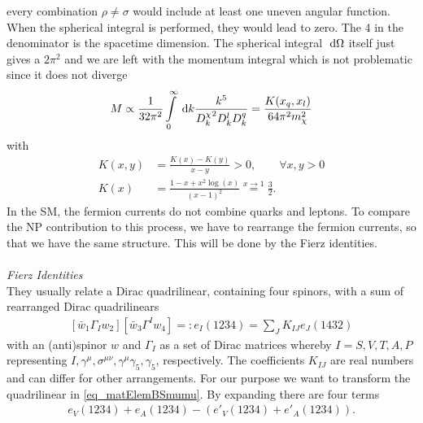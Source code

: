 every combination $\rho\neq\sigma$ would include at least one uneven angular function. When the spherical integral is performed, they would lead to zero. The 
4 in the denominator is the spacetime dimension. The spherical integral $\; \mathrm{d} \Omega$ itself just gives a $2\pi^2$ and we are left with the momentum integral
which is not problematic since it does not diverge
\begin{align}
 M \propto \frac{1}{32\pi^2} \int\limits_0^\infty \; \mathrm{d} k \frac{k^5}{{D^\chi_k}^2D^l_k D^q_k} = \frac{K(x_q,x_l)}{64\pi^2 m_\chi^2}
\end{align}
with
\begin{align}
 K(x,y) &= \frac{K(x)-K(y)}{x-y} > 0, \qquad\forall x,y > 0\\
 K(x)&=\frac{1-x+x^2\log(x)}{(x-1)^2} \stackrel{x\rightarrow 1}{=} \frac32.
\end{align}
In the SM, the fermion currents do not combine quarks and leptons. To compare the NP contribution to this process, we have to rearrange the fermion currents,
so that we have the same structure. This will be done by the Fierz identities.
\\ \\ \noindent \textit{Fierz Identities}\\
They usually relate a Dirac quadrilinear, containing four spinors, with a sum of rearranged Dirac quadrilinears \cite{Fierz}
\begin{align}
  \left[\bar w_1\Gamma_I^{} w_2\right] \left[\bar w_3 \Gamma^I w_4 \right] =: e_I(1234) = \sum\limits_J K_{IJ} e_J(1432)
\end{align}
with an (anti)spinor $w$ and $\Gamma_I$ as a set of Dirac matrices whereby $I=S,V,T,A,P$ representing $I,\gamma^\mu,\sigma^{\mu\nu},\gamma^\mu\gamma_5,\gamma_5$, 
respectively. The coefficients $K_{IJ}$ are real numbers and can differ for other arrangements.
\noindent For our purpose we want to transform the quadrilinear in \eqref{eq_matElemBSmumu}. By expanding there are four terms
\begin{align}
 e_V(1234)+e_A(1234)-\left(e'_V(1234) + e'_A(1234)\right).
 \label{eq_fierz}
\end{align}
